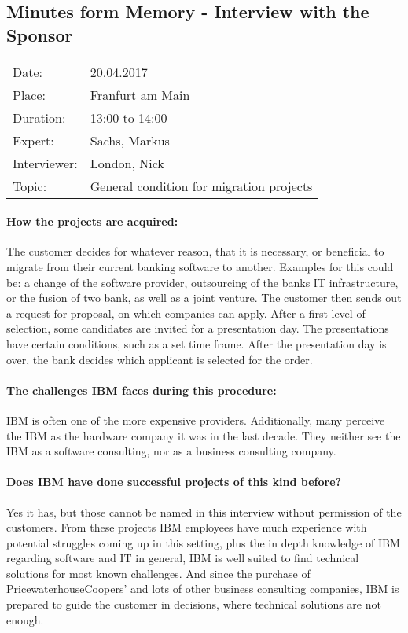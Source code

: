 \subsection*{Minutes form Memory  - Interview with the Sponsor}
\begin{tabular}{l l}
Date: & 20.04.2017 \\
Place: & Franfurt am Main \\
Duration: & 13:00 to 14:00 \\
Expert: & Sachs, Markus \\
Interviewer: & London, Nick \\
Topic: & General condition for migration projects
\end{tabular}

\paragraph{How the projects are acquired:}
The customer decides for whatever reason, that it is necessary, or beneficial to migrate from their current banking software to another. Examples for this could be: a change of the software provider, outsourcing of the banks IT infrastructure, or the fusion of two bank, as well as a joint venture. The customer then sends out a request for proposal, on which companies can apply. After a first level of selection, some candidates are invited for a presentation day. The presentations have certain conditions, such as a set time frame. After the presentation day is over, the bank decides which applicant is selected for the order.
\paragraph{The challenges IBM faces during this procedure:}
IBM is often one of the more expensive providers. Additionally, many perceive the IBM as the hardware company it was in the last decade. They neither see the IBM as a software consulting, nor as a business consulting company.
\paragraph{Does IBM have done successful projects of this kind before?} Yes it has, but those cannot be named in this interview without permission of the customers. From these projects IBM employees have much experience with potential struggles coming up in this setting, plus the in depth knowledge of IBM regarding software and IT in general, IBM is well suited to find technical solutions for most known challenges. And since the purchase of PricewaterhouseCoopers' and lots of other business consulting companies, IBM is prepared to guide the customer in decisions, where technical solutions are not enough.


